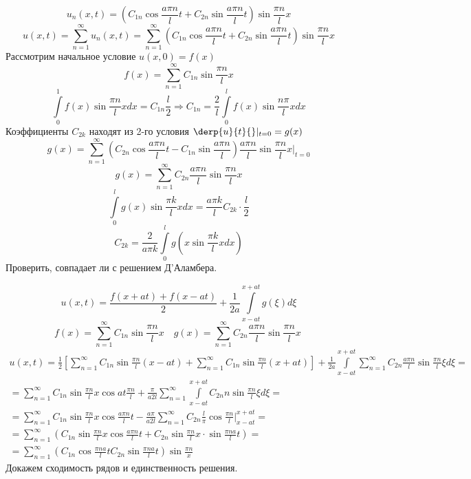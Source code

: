 		\[
			u_n (x, t) = \left(C_{1n} \cos \frac{a \pi n}{l} t + C_{2n} \sin \frac{a \pi n}{l} t \right) \sin\frac{\pi n}{l} x
		\]
		\[
			u(x, t) = \sum\limits_{n = 1}^{\infty} u_n (x, t) = \sum\limits_{n = 1}^{\infty} \left(C_{1n} \cos \frac{a \pi n}{l} t + C_{2n} \sin \frac{a \pi n}{l} t \right) \sin\frac{\pi n}{l} x
		\]
		Рассмотрим начальное условие $u(x,0) = f(x)$\\
		\[
			f(x) = \sum\limits_{n = 1}^{\infty} C_{1n} \sin \frac{\pi n}{l} x
		\]
		\[
			\int\limits_0^1 f(x) \sin \frac{\pi n}{l} x dx = C_{1n} \frac{l}{2} \Rightarrow C_{1n} = \frac{2}{l} \int\limits_0^l f(x) \sin \frac{n \pi}{l} x dx
		\]
		Коэффициенты $C_{2k}$ находят из 2-го условия $\derp{u}{t}{} |_{t = 0} = g(x)$\\
		\[
			g(x) = \sum\limits_{n = 1}^{\infty}\left(C_{2n}\cos \frac{a \pi n}{l} t - C_{1n} \sin \frac{a \pi n}{l} \right) \frac{a \pi n}{l} \sin \frac{\pi n}{l} x |_{t = 0}
		\]
		\[
			g(x) = \sum\limits_{n = 1}^{\infty} C_{2n} \frac{a \pi n}{l} \sin \frac{\pi n}{l} x
		\]
		\[
			\int\limits_0^l g(x) \sin \frac{\pi k}{l} x dx = \frac{a \pi k}{l} C_{2k} \cdot \frac{l}{2}
		\]
		\[
			C_{2k} = \frac{2}{a \pi k} \int\limits_0^l g(x \sin \frac{\pi k}{l} x dx)
		\]
		Проверить, совпадает ли с решением Д'Аламбера.

		\[	
			u(x, t) = \frac{f(x + at) + f(x - at)}{2} + \frac{1}{2a} \int\limits_{x - at}^{x + at} g(\xi) d \xi
		\]
		\[
			f(x) = \sum\limits_{n = 1}^{\infty} C_{1n} \sin \frac{\pi n}{l} x \quad g(x) = \sum\limits_{n = 1}^{\infty} C_{2n} \frac{a \pi n}{l} \sin \frac{\pi n}{l} x\
		\]
		\begin{multline*}
			u(x,t) = \frac{1}{2} \left[ \sum\limits_{n = 1}^{\infty} C_{1n} \sin \frac{\pi n}{l} (x - at) + \sum\limits_{n = 1}^{\infty} C_{1n} \sin \frac{\pi n}{l} (x + at)\right] + \frac{1}{2a} \int\limits_{x - at}^{x + at} \sum\limits_{n = 1}^{\infty} C_{2n} \frac{a \pi n}{l} \sin \frac{\pi n}{l} \xi d \xi =\\
			= \sum\limits_{n = 1}^{\infty} C_{1n} \sin \frac{\pi n}{l} x \cos at \frac{\pi n}{l} +\frac{\pi}{a 2 l} \sum\limits_{n = 1}^{\infty} \int\limits_{x - at}^{x + at} C_{2n} n \sin\frac{\pi n}{l}\xi d \xi =\\
			= \sum\limits_{n = 1}^{\infty}C_{1n} \sin \frac{\pi n}{l} x \cos \frac{a \pi n}{l} t - \frac{a \pi}{a 2 l} \sum\limits_{n = 1}^{\infty} C_{2n} \frac{l}{\pi} \cos \frac{\pi n}{l} |_{x - at}^{x + at} =\\
			= \sum\limits_{n = 1}^{\infty} ( C_{1n}\sin \frac{\pi n}{l} x \cos\frac{a \pi n}{l} t + C_{2n} \sin \frac{\pi n}{l} x \cdot \sin \frac{\pi n a}{l} t) =\\
			= \sum\limits_{n = 1}^{\infty} \left(C_{1n} \cos \frac{\pi n a}{l} t C_{2n} \sin \frac{\pi n a}{l} t \right) \sin \frac{\pi n}{x}
		\end{multline*}
		Докажем сходимость рядов и единственность решения.
